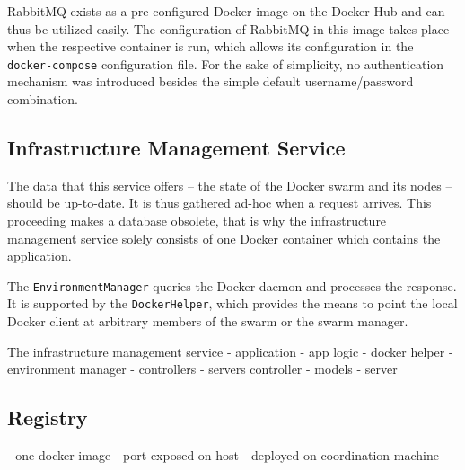       RabbitMQ exists as a pre-configured Docker image on the Docker Hub and can thus be utilized easily. The configuration of RabbitMQ in this image takes place when the respective container is run, which allows its configuration in the \texttt{docker-compose} configuration file.
      For the sake of simplicity, no authentication mechanism was introduced besides the simple default username/password combination.

  \subsection{Infrastructure Management Service} %
    \label{sub:infrastructure_management_service}
      The data that this service offers -- the state of the Docker swarm and its nodes -- should be up-to-date. It is thus gathered ad-hoc when a request arrives. This proceeding makes a database obsolete, that is why the infrastructure management service solely consists of one Docker container which contains the application.

      The \texttt{EnvironmentManager} queries the Docker daemon and processes the response. It is supported by the \texttt{DockerHelper}, which provides the means to point the local Docker client at arbitrary members of the swarm or the swarm manager.



      The infrastructure management service
      - application
        - app logic
          - docker helper
          - environment manager
        - controllers
          - servers controller
        - models
          - server


  \subsection{Registry} %
    \label{sub:registry}
    - one docker image
    - port exposed on host
    - deployed on coordination machine

